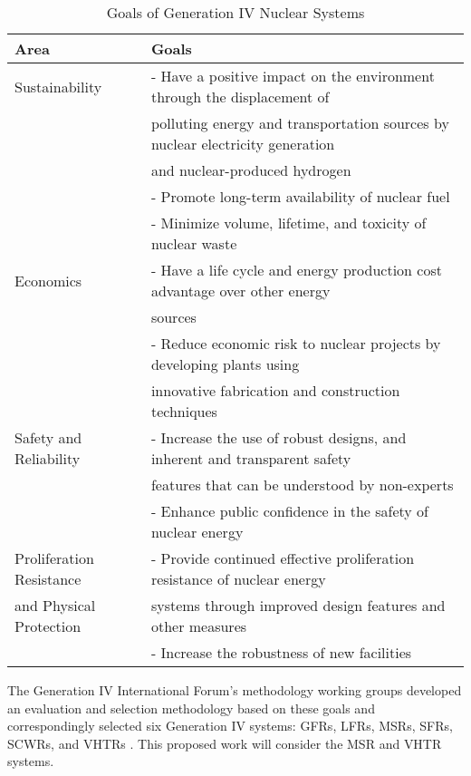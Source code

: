 \begin{table}[]
    \centering
    \onehalfspacing
    \caption{Goals of Generation IV Nuclear Systems \cite{gif_technology_2002,
    behar_technology_2014}}
	\label{tab:goals-gen4}
    \small
    \begin{tabular}{l|l}
    \hline
                               \textbf{Area} & \textbf{Goals} \\ \hline
    Sustainability   & - Have a positive impact on the environment through the displacement of \\
    & polluting energy and transportation sources by nuclear electricity generation \\
    & and nuclear-produced hydrogen \\ 
    & - Promote long-term availability of nuclear fuel \\
    & - Minimize volume, lifetime, and toxicity of nuclear waste \\ \hline
    Economics & - Have a life cycle and energy production cost advantage over other energy \\
    & sources \\ 
    & - Reduce economic risk to nuclear projects by developing plants using \\
    & innovative fabrication and construction techniques \\ \hline
    Safety and Reliability   & - Increase the use of robust designs, and inherent and transparent safety\\
    & features that can be understood by non-experts \\ 
    & - Enhance public confidence in the safety of nuclear energy \\\hline
    Proliferation Resistance & - Provide continued effective proliferation resistance of nuclear energy \\
    and Physical Protection & systems through improved design features and other measures \\ 
    & - Increase the robustness of new facilities \\ \hline
    \end{tabular}
    \end{table}

The Generation IV International Forum's methodology working groups developed 
an evaluation and selection methodology based on these goals 
and correspondingly selected six Generation IV systems: \glspl{GFR}, 
\glspl{LFR}, \glspl{MSR}, \glspl{SFR}, \glspl{SCWR}, and \glspl{VHTR} 
\cite{gif_technology_2002}. 
This proposed work will consider the \gls{MSR} and \gls{VHTR} systems. 

